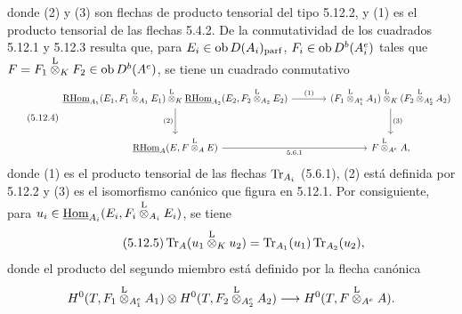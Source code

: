 donde (2) y (3) son flechas de producto tensorial del tipo 5.12.2, y (1) es el producto tensorial de las flechas 5.4.2. De la conmutatividad de los cuadrados 5.12.1 y 5.12.3 resulta que, para $E_i\in\operatorname{ob} D(A_i)_{\mathrm{parf}}$, $F_i\in\operatorname{ob} D^b(A_i^e)$ tales que $F=F_1\overset{\mathrm L}{\otimes}_KF_2\in\operatorname{ob} D^b(A^e)$, se tiene un cuadrado conmutativo
\begin{equation}\tag{5.12.4}
\begin{tikzcd}[column sep=large,row sep=large]
\uRHom_{A_1}(E_1,F_1\lten_{A_1}E_1)\lten_K\uRHom_{A_2}(E_2,F_2\lten_{A_2}E_2) \arrow[r,"(1)"] \arrow[d,"(2)"'] & (F_1\lten_{A_1^e}A_1)\lten_K(F_2\lten_{A_2^e}A_2) \arrow[d,"(3)"]\\
\uRHom_A(E,F\lten_AE) \arrow[r,"5.6.1"'] & F\lten_{A^e}A,
\end{tikzcd}
\end{equation}
donde (1) es el producto tensorial de las flechas $\operatorname{Tr}_{A_i}$ (5.6.1), (2) está definida por 5.12.2 y (3) es el isomorfismo canónico que figura en 5.12.1. Por consiguiente, para $u_i\in\underline{\operatorname{Hom}}_{A_i}(E_i,F_i\overset{\mathrm L}{\otimes}_{A_i}E_i)$, se tiene
\begin{equation}\tag{5.12.5}
\operatorname{Tr}_A(u_1\overset{\mathrm L}{\otimes}_Ku_2)=\operatorname{Tr}_{A_1}(u_1)\operatorname{Tr}_{A_2}(u_2),
\end{equation}
donde el producto del segundo miembro está definido por la flecha canónica
\[
H^0(T,F_1\overset{\mathrm L}{\otimes}_{A_1^e}A_1)\otimes H^0(T,F_2\overset{\mathrm L}{\otimes}_{A_2^e}A_2)
\longrightarrow H^0(T,F\overset{\mathrm L}{\otimes}_{A^e}A).
\]

